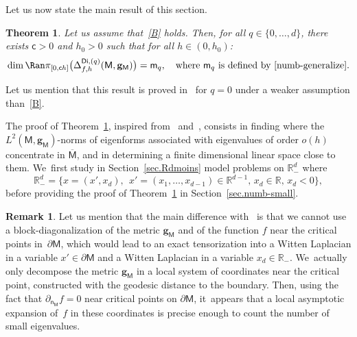 \documentclass[JEP,XML,SOM,Unicode,NoEqCountersInSection,NoFloatCountersInSection,published]{cedram}
\newcommand{\mbf}[1]{\mathbf{#1}}
\let\pa\partial
\theoremstyle{plain}
\newtheorem{theorem}{Theorem}
\theoremstyle{definition}
\newtheorem{remark}[proposition]{Remark}
\begin{document}
Let us now state the main result of this section.
\begin{theorem}\label{thm.main1}
Let us assume that~\ref{B} holds. Then, for all $q\in \{0,\ldots,d\}$, there exists $\mathsf c>0$ and $h_0>0$ such that for all $h\in (0,h_0)$:\vspace*{-3pt}
\[
\dim \Ran \pi_{[0,\mathsf ch]}\bigl(\Delta_{f,h}^{\mathsf{Di},(q)}(\mathsf M,\mbf g_{\mathsf M})\bigr)=\mathsf m_q, \quad \text{where $\mathsf m_q$ is defined by~\eqref{numb-generalize}}.
\]
\end{theorem}

Let us mention that this result is proved in~\cite{DoNe2} for $q=0$ under a weaker assumption than~\ref{B}.

The proof of Theorem~\ref{thm.main1}, inspired from~\cite[\S 3]{helffer-nier-06} and~\cite{CFKS}, consists in finding where the $L^2(\mathsf
M,\mbf g_{\mathsf M})$-norms of eigenforms associated with eigenvalues
of order $o(h)$ concentrate in $\overline{\mathsf M}$, and in
determining a finite dimensional linear space close to them. We~first
study in
Section~\ref{sec.Rdmoins} model problems on $\mathbb R^{d}_-$ where\vspace*{-3pt}
\[
\mathbb
R^d_-=\{x=(x',x_d),\ \ x'=(x_1,\ldots,x_{d-1})\in \mathbb R^{d-1}, \,
x_d\in \mathbb R, \, x_d<0\},
\]
before providing the proof of Theorem~\ref{thm.main1} in Section~\ref{sec.numb-small}.

\begin{remark}\label{rem:numb-small}
Let us mention that the main difference with~\cite[Chap.\,3]{helffer-nier-06}
is that we cannot use a block-diagonalization of the metric $\mbf
g_{\mathsf M}$ and of the function $f$ near the critical points
in~$\pa \mathsf M$, which would lead to an exact tensorization into a Witten Laplacian in a variable $x'\in \pa \mathsf M$ and a Witten
Laplacian in a variable $x_d\in \mathbb R_-$. We~actually only decompose the metric $\mbf g_{\mathsf
M}$ in a local system of coordinates near the critical point,
constructed with the geodesic distance to the boundary. Then, using the
fact that $\partial_{\mathsf n_{\mathsf
M}}f=0$ near critical points on $\partial \mathsf M$, it~appears that a local
asymptotic expansion of~$f$ in these coordinates is precise enough to count the number of small eigenvalues.
\end{remark}
\end{document}
